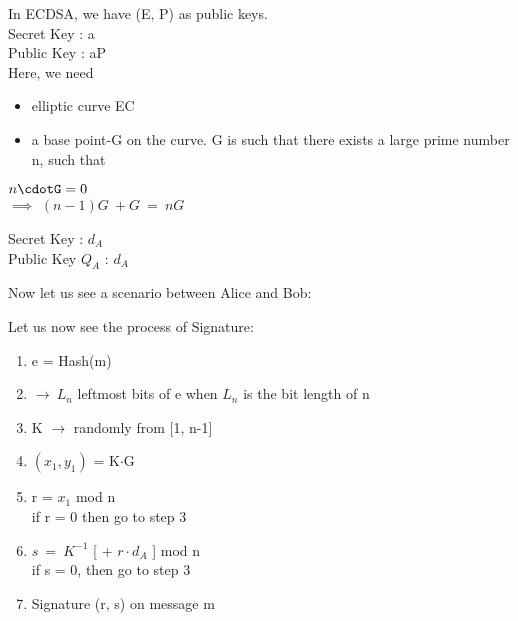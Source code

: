 \documentclass[11pt]{article}
\begin{document}
In ECDSA, we have (E, P) as public keys.\\
    Secret Key : a\\
    Public Key : aP\\
Here, we need 
\begin{itemize}
    \item elliptic curve EC
    \item a base point-G on the curve. G is such that there exists a large prime number n, such that
\end{itemize}
\begin{center}
    $n\cdotG = 0$\\
    $\implies$ $(n-1)G\ \boxed{+} G\ =\ nG$\\
\end{center}
\begin{center}
    Secret Key : $d_A$\\
    Public Key $Q_A$ : $d_A$
\end{center}
Now let us see a scenario between Alice and Bob:
\begin{center}
\end{center}
Let us now see the process of Signature:
\begin{enumerate}
    \item e = Hash(m)
    \item \zbar $\rightarrow\ L_n$ leftmost bits of e when $L_n$ is the bit length of n
    \item K $\rightarrow$ randomly from [1, n-1]
    \item $(x_1, y_1)$ = K$\cdot$G
    \item r = $x_1$ mod n\\
    if r = 0 then go to step 3\\
    \item $s\ =\ K^{-1}$ [ \zbar + $r \cdot d_A $  ] mod n\\
    if s = 0, then go to step 3
    \item Signature (r, s) on message m
\end{enumerate}
\end{document}

